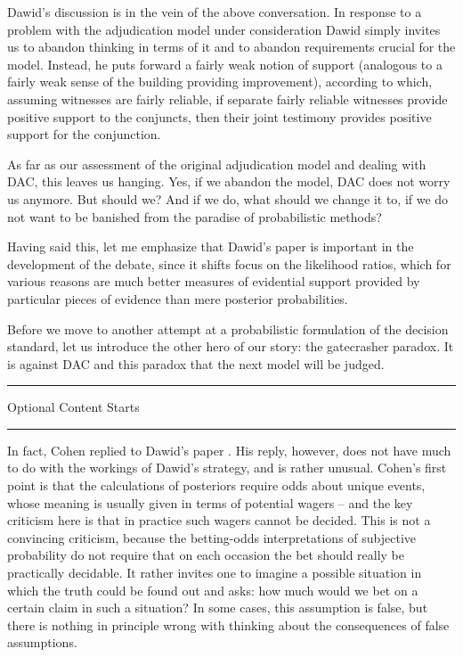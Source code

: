 \documentclass{ifcolog}
\newcommand{\intermezzoa}{
	\begin{minipage}[c]{13cm}
	\begin{center}\rule{10cm}{0.4pt}



	\tiny{\sc Optional Content Starts}
	
	\vspace{-1mm}
	
	\rule{10cm}{0.4pt}\end{center}
	\end{minipage}\nopagebreak 
	}
\begin{document}
 Dawid's discussion is in the vein of the above conversation. In response to a problem with the adjudication model under consideration Dawid simply invites us to abandon thinking in terms of it and to abandon requirements crucial for the model.  Instead, he puts forward a fairly weak notion of support (analogous to a fairly weak sense of the building providing improvement), according to which,  assuming witnesses are fairly reliable,  if separate fairly reliable witnesses provide positive support to the conjuncts, then their joint testimony provides positive support for the conjunction. 

 As far as our assessment of the original adjudication model and dealing  with DAC, this leaves us hanging. Yes, if we abandon the model, DAC does not worry us anymore. But should we? And if we do, what should we change it to, if we do not want to be banished from the paradise of probabilistic methods?  




   Having said this, let me emphasize that Dawid's paper is important in the development of the debate, since it shifts focus on the likelihood ratios, which for various reasons are much better measures of evidential support provided by particular pieces of evidence than mere posterior probabilities. 



Before we move to another attempt at a probabilistic formulation of the decision standard, let us introduce the other hero of our story: the gatecrasher paradox. It is against DAC and this paradox that the next model will be judged. 















\intermezzoa

In fact, Cohen replied to Dawid's paper \citep{cohen1988difficulty}. His reply, however, does not have much to do with the workings of Dawid's strategy, and is rather unusual. Cohen's first point is that the calculations of posteriors require odds about unique events, whose meaning is usually given in terms of potential wagers -- and the key criticism here is that in practice such wagers cannot be decided. This is not a convincing criticism, because the betting-odds interpretations of subjective probability do not require that on each occasion the bet should really be practically decidable. It rather invites one to imagine a possible situation in which the truth could be found out and asks: how much would we bet on a certain claim in such a situation? In some cases, this assumption is false, but there is nothing in principle wrong with thinking about the consequences of false assumptions. 
\end{document}
